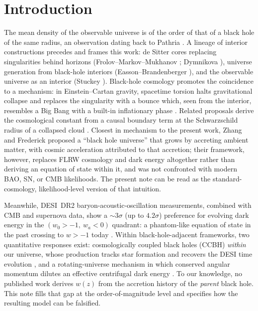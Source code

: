 \documentclass[11pt]{article}
\begin{document}
\section{Introduction}
The mean density of the observable universe is of the order of that of a black hole of the same radius, an observation dating back to Pathria \cite{Pathria1972}. A lineage of interior constructions precedes and frames this work: de Sitter cores replacing singularities behind horizons (Frolov--Markov--Mukhanov \cite{FMM1989}; Dymnikova \cite{Dymnikova1992}), universe generation from black-hole interiors (Easson--Brandenberger \cite{EB2001}), and the observable universe as an interior (Stuckey \cite{Stuckey1994}). Black-hole cosmology promotes the coincidence to a mechanism: in Einstein--Cartan gravity, spacetime torsion halts gravitational collapse and replaces the singularity with a bounce which, seen from the interior, resembles a Big Bang with a built-in inflationary phase \cite{Poplawski2010,Poplawski2016}. Related proposals derive the cosmological constant from a causal boundary term at the Schwarzschild radius of a collapsed cloud \cite{Gaztanaga2021,Gaztanaga2022}. Closest in mechanism to the present work, Zhang and Frederick \cite{Zhang2013} proposed a ``black hole universe'' that grows by accreting ambient matter, with cosmic acceleration attributed to that accretion; their framework, however, replaces FLRW cosmology and dark energy altogether rather than deriving an equation of state within it, and was not confronted with modern BAO, SN, or CMB likelihoods. The present note can be read as the standard-cosmology, likelihood-level version of that intuition.

Meanwhile, DESI~DR2 baryon-acoustic-oscillation measurements, combined with CMB and supernova data, show a $\sim 3\sigma$ (up to $4.2\sigma$) preference for evolving dark energy in the $(w_0 > -1,\ w_a < 0)$ quadrant: a phantom-like equation of state in the past crossing to $w > -1$ today \cite{DESI2025}. Within black-hole-adjacent frameworks, two quantitative responses exist: cosmologically coupled black holes (CCBH) \emph{within} our universe, whose production tracks star formation and recovers the DESI time evolution \cite{Croker2024}, and a rotating-universe mechanism in which conserved angular momentum dilutes an effective centrifugal dark energy \cite{Poplawski2025}. To our knowledge, no published work derives $w(z)$ from the accretion history of the \emph{parent} black hole. This note fills that gap at the order-of-magnitude level and specifies how the resulting model can be falsified.
\end{document}

